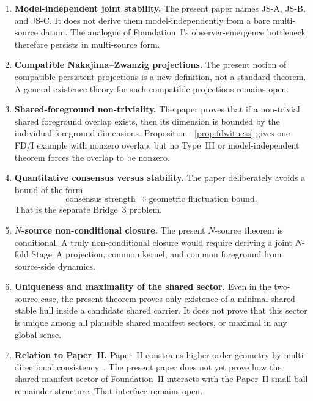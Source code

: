 \documentclass[12pt]{article}
\theoremstyle{definition}
\theoremstyle{remark}
\begin{document}
\begin{enumerate}
\item \textbf{Model-independent joint stability.} The present paper
  names JS-A, JS-B, and JS-C. It does not derive them model-independently
  from a bare multi-source datum. The analogue of Foundation~I's
  observer-emergence bottleneck therefore persists in multi-source form.

\item \textbf{Compatible Nakajima--Zwanzig projections.} The present
  notion of compatible persistent projections is a new definition, not a
  standard theorem. A general existence theory for such compatible
  projections remains open.

\item \textbf{Shared-foreground non-triviality.} The paper proves that
  if a non-trivial shared foreground overlap exists, then its dimension
  is bounded by the individual foreground dimensions. Proposition~
  \ref{prop:fdwitness} gives one FD/I example with nonzero overlap, but
  no Type~III or model-independent theorem forces the overlap to be
  nonzero.

\item \textbf{Quantitative consensus versus stability.} The paper
  deliberately avoids a bound of the form
  \[
  \text{consensus strength}
  \Longrightarrow
  \text{geometric fluctuation bound}.
  \]
  That is the separate Bridge~3 problem.

\item \textbf{\(N\)-source non-conditional closure.} The present
  \(N\)-source theorem is conditional. A truly non-conditional closure
  would require deriving a joint \(N\)-fold Stage~A projection, common
  kernel, and common foreground from source-side dynamics.

\item \textbf{Uniqueness and maximality of the shared sector.} Even in
  the two-source case, the present theorem proves only existence of a
  minimal shared stable hull inside a candidate shared carrier. It does
  not prove that this sector is unique among all plausible shared
  manifest sectors, or maximal in any global sense.

\item \textbf{Relation to Paper~II.} Paper~II constrains higher-order
  geometry by multi-directional consistency~\cite{PaperII}. The present
  paper does not yet prove how the shared manifest sector of
  Foundation~II interacts with the Paper~II small-ball remainder
  structure. That interface remains open.


\end{enumerate}
\end{document}
